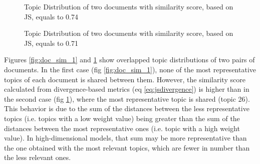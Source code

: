 \begin{figure}[!htb]\centering
   \begin{minipage}{0.49\textwidth}
     \caption{Topic Distribution of two documents with similarity score, based on JS, equals to 0.74}\label{fig:doc_sim_1}
   \end{minipage}
   \begin {minipage}[c]{0.49\textwidth}
     \caption{Topic Distribution of two documents with similarity score, based on JS, equals to 0.71}\label{fig:doc_sim_2}
   \end{minipage}
\end{figure}

Figures \ref{fig:doc_sim_1} and \ref{fig:doc_sim_2} show overlapped topic distributions of two pairs of documents. In the first case (fig  \ref{fig:doc_sim_1}), none of the most representative topics of each document is shared between them. However, the similarity score calculated from divergence-based metrics (eq \ref{eq:jsdivergence}) is higher than in the second case (fig  \ref{fig:doc_sim_2}), where the most representative topic is shared (topic 26). This behavior is due to the sum of the distances between the less representative topics (i.e. topics with a low weight value) being greater than the sum of the distances between the most representative ones (i.e. topic with a high weight value). In high-dimensional models, that sum may be more representative than the one obtained with the most relevant topics, which are fewer in number than the less relevant ones. 

